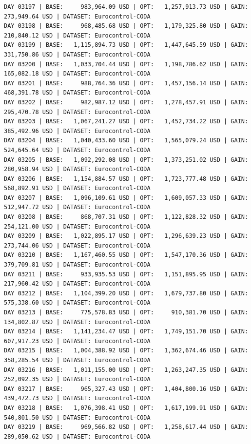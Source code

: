 \documentclass[11pt,a4paper]{article}
\begin{document}
\begin{verbatim}
DAY 03197 | BASE:     983,964.09 USD | OPT:   1,257,913.73 USD | GAIN: 273,949.64 USD | DATASET: Eurocontrol-CODA
DAY 03198 | BASE:     968,485.68 USD | OPT:   1,179,325.80 USD | GAIN: 210,840.12 USD | DATASET: Eurocontrol-CODA
DAY 03199 | BASE:   1,115,894.73 USD | OPT:   1,447,645.59 USD | GAIN: 331,750.86 USD | DATASET: Eurocontrol-CODA
DAY 03200 | BASE:   1,033,704.44 USD | OPT:   1,198,786.62 USD | GAIN: 165,082.18 USD | DATASET: Eurocontrol-CODA
DAY 03201 | BASE:     988,764.36 USD | OPT:   1,457,156.14 USD | GAIN: 468,391.78 USD | DATASET: Eurocontrol-CODA
DAY 03202 | BASE:     982,987.12 USD | OPT:   1,278,457.91 USD | GAIN: 295,470.78 USD | DATASET: Eurocontrol-CODA
DAY 03203 | BASE:   1,067,241.27 USD | OPT:   1,452,734.22 USD | GAIN: 385,492.96 USD | DATASET: Eurocontrol-CODA
DAY 03204 | BASE:   1,040,433.60 USD | OPT:   1,565,079.24 USD | GAIN: 524,645.64 USD | DATASET: Eurocontrol-CODA
DAY 03205 | BASE:   1,092,292.08 USD | OPT:   1,373,251.02 USD | GAIN: 280,958.94 USD | DATASET: Eurocontrol-CODA
DAY 03206 | BASE:   1,154,884.57 USD | OPT:   1,723,777.48 USD | GAIN: 568,892.91 USD | DATASET: Eurocontrol-CODA
DAY 03207 | BASE:   1,096,109.61 USD | OPT:   1,609,057.33 USD | GAIN: 512,947.72 USD | DATASET: Eurocontrol-CODA
DAY 03208 | BASE:     868,707.31 USD | OPT:   1,122,828.32 USD | GAIN: 254,121.00 USD | DATASET: Eurocontrol-CODA
DAY 03209 | BASE:   1,022,895.17 USD | OPT:   1,296,639.23 USD | GAIN: 273,744.06 USD | DATASET: Eurocontrol-CODA
DAY 03210 | BASE:   1,167,460.55 USD | OPT:   1,547,170.36 USD | GAIN: 379,709.81 USD | DATASET: Eurocontrol-CODA
DAY 03211 | BASE:     933,935.53 USD | OPT:   1,151,895.95 USD | GAIN: 217,960.42 USD | DATASET: Eurocontrol-CODA
DAY 03212 | BASE:   1,104,399.20 USD | OPT:   1,679,737.80 USD | GAIN: 575,338.60 USD | DATASET: Eurocontrol-CODA
DAY 03213 | BASE:     775,578.83 USD | OPT:     910,381.70 USD | GAIN: 134,802.87 USD | DATASET: Eurocontrol-CODA
DAY 03214 | BASE:   1,141,234.47 USD | OPT:   1,749,151.70 USD | GAIN: 607,917.23 USD | DATASET: Eurocontrol-CODA
DAY 03215 | BASE:   1,004,388.92 USD | OPT:   1,362,674.46 USD | GAIN: 358,285.54 USD | DATASET: Eurocontrol-CODA
DAY 03216 | BASE:   1,011,155.00 USD | OPT:   1,263,247.35 USD | GAIN: 252,092.35 USD | DATASET: Eurocontrol-CODA
DAY 03217 | BASE:     965,327.43 USD | OPT:   1,404,800.16 USD | GAIN: 439,472.73 USD | DATASET: Eurocontrol-CODA
DAY 03218 | BASE:   1,076,398.41 USD | OPT:   1,617,199.91 USD | GAIN: 540,801.50 USD | DATASET: Eurocontrol-CODA
DAY 03219 | BASE:     969,566.82 USD | OPT:   1,258,617.44 USD | GAIN: 289,050.62 USD | DATASET: Eurocontrol-CODA

\end{verbatim}
\end{document}
